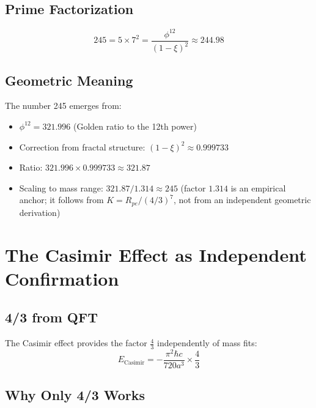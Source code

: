 	\subsection{Prime Factorization}
	\begin{equation}
		245 = 5 \times 7^2 = \frac{\phi^{12}}{(1 - \xi)^2} \approx 244.98
	\end{equation}
	
	\subsection{Geometric Meaning}
	
	The number 245 emerges from:
	\begin{itemize}
		\item $\phi^{12} = 321.996$ (Golden ratio to the 12th power)
		\item Correction from fractal structure: $(1 - \xi)^2 \approx 0.999733$
		\item Ratio: $321.996 \times 0.999733 \approx 321.87$
		\item Scaling to mass range: $321.87/1.314 \approx 245$ (factor $1.314$ is an empirical anchor; it follows from $K = R_{pe}/(4/3)^7$, not from an independent geometric derivation)
	\end{itemize}
	
	\section{The Casimir Effect as Independent Confirmation}
	
	\subsection{4/3 from QFT}
	
	The Casimir effect provides the factor $\frac{4}{3}$ independently of mass fits:
	\begin{equation}
		E_{\text{Casimir}} = -\frac{\pi^2 \hbar c}{720 a^3} \times \frac{4}{3}
	\end{equation}
	
	\subsection{Why Only 4/3 Works}
	
	\begin{table}[htbp]
		\centering
		\caption{Only the fourth (4/3) yields consistent results}
	\end{table}
	
